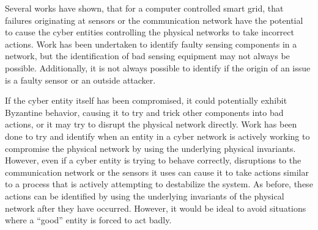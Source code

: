 Several works have shown, that for a computer controlled smart grid, that failures originating at sensors or the communication network have the potential to cause the cyber entities controlling the physical networks to take incorrect actions.
Work has been undertaken to identify faulty sensing components in a network, but the identification of bad sensing equipment may not always be possible.
Additionally, it is not always possible to identify if the origin of an issue is a faulty sensor or an outside attacker.

If the cyber entity itself has been compromised, it could potentially exhibit Byzantine behavior, causing it to try and trick other components into bad actions, or it may try to disrupt the physical network directly.
Work has been done to try and identify when an entity in a cyber network is actively working to compromise the physical network by using the underlying physical invariants.
However, even if a cyber entity is trying to behave correctly, disruptions to the communication network or the sensors it uses can cause it to take actions similar to a process that is actively attempting to destabilize the system.
As before, these actions can be identified by using the underlying invariants of the physical network after they have occurred.
However, it would be ideal to avoid situations where a ``good'' entity is forced to act badly.

